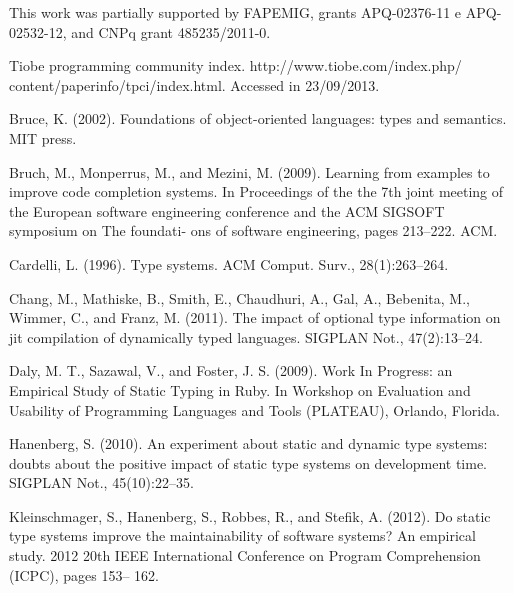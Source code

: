 \documentclass[preprint]{sigplanconf}
\begin{document}
\acks
This work was partially supported by FAPEMIG, grants APQ-02376-11 e APQ-02532-12, and CNPq grant 485235/2011-0. 


%
%

\renewcommand{\bibfont}{\normalsize}
\begin{thebibliography}{}
\softraggedright

Tiobe programming community index. http://www.tiobe.com/index.php/ content/paperinfo/tpci/index.html. Accessed in 23/09/2013.

Bruce, K. (2002). Foundations of object-oriented languages: types and semantics. MIT press.

Bruch, M., Monperrus, M., and Mezini, M. (2009). Learning from examples to improve code completion systems. In Proceedings of the the 7th joint meeting of the European software engineering conference and the ACM SIGSOFT symposium on The foundati- ons of software engineering, pages 213–222. ACM.

Cardelli, L. (1996). Type systems. ACM Comput. Surv., 28(1):263–264.

Chang, M., Mathiske, B., Smith, E., Chaudhuri, A., Gal, A., Bebenita, M., Wimmer, C., and Franz, M. (2011). The impact of optional type information on jit compilation of dynamically typed languages. SIGPLAN Not., 47(2):13–24.

Daly, M. T., Sazawal, V., and Foster, J. S. (2009). Work In Progress: an Empirical Study of Static Typing in Ruby. In Workshop on Evaluation and Usability of Programming Languages and Tools (PLATEAU), Orlando, Florida.

Hanenberg, S. (2010). An experiment about static and dynamic type systems: doubts about the positive impact of static type systems on development time. SIGPLAN Not., 45(10):22–35.

Kleinschmager, S., Hanenberg, S., Robbes, R., and Stefik, A. (2012). Do static type systems improve the maintainability of software systems? An empirical study. 2012 20th IEEE International Conference on Program Comprehension (ICPC), pages 153– 162.


\end{thebibliography}
\end{document}
